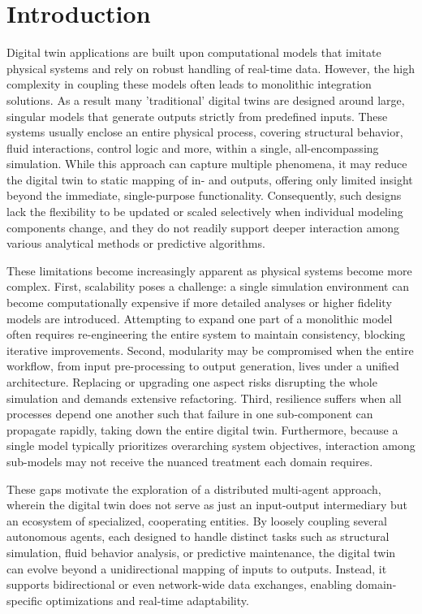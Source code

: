 \section{Introduction}
Digital twin applications are built upon computational models that imitate physical systems and rely on robust handling of real-time data. However, the high complexity in coupling these models often leads to monolithic integration solutions. As a result many 'traditional' digital twins are designed around large, singular models that generate outputs strictly from predefined inputs. These systems usually enclose an entire physical process, covering structural behavior, fluid interactions, control logic and more, within a single, all-encompassing simulation. While this approach can capture multiple phenomena, it may reduce the digital twin to static mapping of in- and outputs, offering only limited insight beyond the immediate, single-purpose functionality. Consequently, such designs lack the flexibility to be updated or scaled selectively when individual modeling components change, and they do not readily support deeper interaction among various analytical methods or predictive algorithms.

These limitations become increasingly apparent as physical systems become more complex. First, scalability poses a challenge: a single simulation environment can become computationally expensive if more detailed analyses or higher fidelity models are introduced. Attempting to expand one part of a monolithic model often requires re-engineering the entire system to maintain consistency, blocking iterative improvements. Second, modularity may be compromised when the entire workflow, from input pre-processing to output generation, lives under a unified architecture. Replacing or upgrading one aspect risks disrupting the whole simulation and demands extensive refactoring. Third, resilience suffers when all processes depend one another such that failure in one sub-component can propagate rapidly, taking down the entire digital twin. Furthermore, because a single model typically prioritizes overarching system objectives, interaction among sub-models may not receive the nuanced treatment each domain requires.

These gaps motivate the exploration of a distributed multi-agent approach, wherein the digital twin does not serve as just an input-output intermediary but an ecosystem of specialized, cooperating entities. By loosely coupling several autonomous agents, each designed to handle distinct tasks such as structural simulation, fluid behavior analysis, or predictive maintenance, the digital twin can evolve beyond a unidirectional mapping of inputs to outputs. Instead, it supports bidirectional or even network-wide data exchanges, enabling domain-specific optimizations and real-time adaptability.

